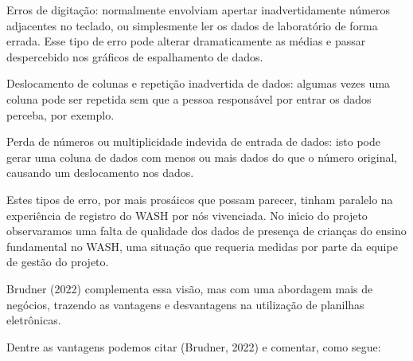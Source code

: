 \documentclass[
12pt,		%
openright,	%
twoside,  %
a4paper,			%
chapter=TITLE,		%
english,			%
french,				%
spanish,			%
brazil				%
]{USPSC-classe/USPSC}
\begin{document}
\begin{alineas}
\item Erros de digita\c{c}\~ao: normalmente envolviam apertar inadvertidamente n\'umeros adjacentes no teclado, ou simplesmente ler os dados de laborat\'orio de forma errada. Esse tipo de erro pode alterar dramaticamente as m\'edias e passar despercebido nos gr\'aficos de espalhamento de dados.
\item Deslocamento de colunas e repeti\c{c}\~ao inadvertida de dados: algumas vezes uma coluna pode ser repetida sem que a pessoa respons\'avel por entrar os dados perceba, por exemplo.
\item Perda de n\'umeros ou multiplicidade indevida de entrada de dados: isto pode gerar uma coluna de dados com menos ou mais dados do que o n\'umero original, causando um deslocamento nos dados.
\end{alineas}

Estes tipos de erro, por mais pros\'aicos que possam parecer, tinham paralelo na experi\^encia de registro do WASH por n\'os vivenciada. No in\'{\i}cio do projeto observaramos uma falta de qualidade dos dados de presen\c{c}a de crian\c{c}as do ensino fundamental no WASH, uma situa\c{c}\~ao que requeria medidas por parte da equipe de gest\~ao do projeto.









 Brudner (2022) complementa essa vis\~ao, mas com uma abordagem mais de neg\'ocios, trazendo as vantagens e desvantagens na utiliza\c{c}\~ao de planilhas eletr\^onicas.









Dentre as vantagens podemos citar (Brudner, 2022) e comentar, como segue:
\end{document}
